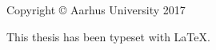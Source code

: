 \thispagestyle{empty}
{\small
\strut\vfill
\noindent Copyright \copyright{} Aarhus University 2017\par
\vspace{0.2cm}
\noindent This thesis has been typeset with \LaTeX.}
\clearpage